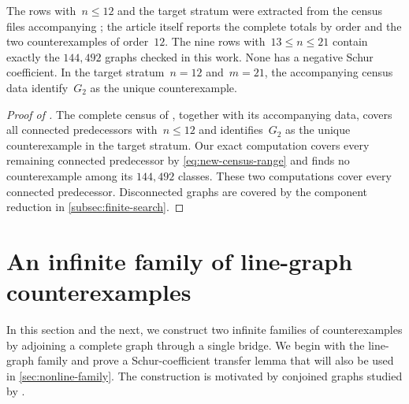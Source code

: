 \documentclass[11pt]{amsart}
\numberwithin{equation}{section}
\theoremstyle{remark}
\newcommand{\Gtwo}{G_{2}}
\begin{document}
The rows with~$n\le12$ and the target stratum were extracted from the
census files accompanying \citet{Prajapati2026}; the article itself
reports the complete totals by order and the two counterexamples of
order~$12$. The nine rows with~$13\le n\le21$ contain exactly the
$144{,}492$ graphs checked in this work.  None has a negative Schur
coefficient.  In the target stratum~$n=12$ and~$m=21$, the accompanying
census data identify~$\Gtwo$ as the unique counterexample. 

\begin{proof}[Proof of ]
The complete census of \citet{Prajapati2026}, together with its
accompanying data, covers all connected predecessors with~$n\le12$ and
identifies~$\Gtwo$ as the unique counterexample in the target stratum.  Our
exact computation covers every remaining connected predecessor by
\cref{eq:new-census-range} and finds no counterexample among its $144{,}492$
classes.  These two computations cover every connected predecessor.
Disconnected graphs are covered by the component reduction in
\cref{subsec:finite-search}.
\end{proof}





\section{An infinite family of line-graph counterexamples}
\label{sec:line-family}

In this section and the next, we construct two infinite families of
counterexamples by adjoining a complete graph through a single bridge.
We begin with the line-graph family and prove a Schur-coefficient transfer
lemma that will also be used in \cref{sec:nonline-family}.  The
construction is motivated by conjoined graphs studied by \citet{QTW26}.
\end{document}

